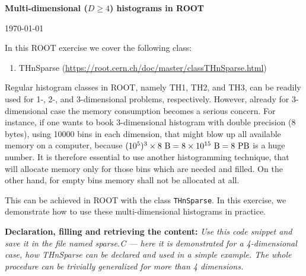 \documentclass[11pt]{article}
\begin{document}
\begin{center}
\Large{\bf{Multi-dimensional ($D \geq 4$) histograms in ROOT}}\\
\end{center}
\begin{center}
{\small\today}
\end{center}

\bigskip

\noindent In this ROOT exercise we cover the following class:
%
\begin{enumerate}
	\item THnSparse (\url{https://root.cern.ch/doc/master/classTHnSparse.html})
\end{enumerate} 
%

\bigskip

\noindent Regular histogram classes in ROOT, namely TH1, TH2, and TH3, can be readily used for 1-, 2-, and 3-dimensional problems, respectively. However, already for 3-dimensional case the memory consumption becomes a serious concern. For instance, if one wants to book 3-dimensional histogram with double precision (8 bytes), using 10000 bins in each dimension, that might blow up all available memory on a computer, because $(10^5)^3 \times 8\ {\rm B} = 8 \times 10^{15}\ {\rm B} = 8\ {\rm PB}$ is a huge number. It is therefore essential to use another histogramming technique, that will allocate memory only for those bins which are needed and filled. On the other hand, for empty bins memory shall not be allocated at all.

This can be achieved in ROOT with the class {\verb |THnSparse|}. In this exercise, we demonstrate how to use these multi-dimensional histograms in practice.

\bigskip

\noindent\textbf{Declaration, filling and retrieving the content:} {\it Use this code snippet and save it in the file named {\it sparse.C} --- here it is demonstrated for a 4-dimensional case, how THnSparse can be declared and used in a simple example. The whole procedure can be trivially generalized for more than 4 dimensions.} 
\end{document}
